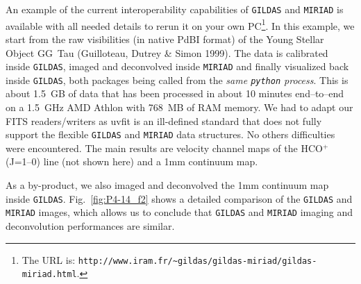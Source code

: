 \documentclass[11pt,twoside]{article}  %
\newcommand{\GILDAS}{\texttt{GILDAS}}
\newcommand{\MIRIAD}{\texttt{MIRIAD}}
\newcommand{\python}{\texttt{python}}
\newcommand{\PdBI}{\textrm{PdBI}}
\newcommand{\HCOp} {\mbox{HCO$^{+}$}} %
\newcommand{\Jone}{\mbox{(J=1--0)}}
\begin{document}
An example of the current interoperability capabilities of \GILDAS{} and
\MIRIAD{} is available with all needed details to rerun it on your own
PC\footnote{The URL is:
  \texttt{http://www.iram.fr/\~{}gildas/gildas-miriad/gildas-miriad.html}.}.
In this example, we start from the raw visibilities (in native \PdBI{}
format) of the Young Stellar Object GG~Tau (Guilloteau, Dutrey \& Simon
1999). The data is calibrated inside \GILDAS{}, imaged and deconvolved
inside \MIRIAD{} and finally visualized back inside \GILDAS{}, both
packages being called from the \emph{same \python{} process}. This is about
1.5~GB of data that has been processed in about 10 minutes end--to--end on
a 1.5~GHz AMD Athlon with 768~MB of RAM memory. We had to adapt our FITS
readers/writers as uvfit is an ill-defined standard that does not fully
support the flexible \GILDAS{} and \MIRIAD{} data structures. No others
difficulties were encountered. The main results are velocity channel maps
of the \HCOp{} \Jone{} line (not shown here) and a 1mm continuum map.

As a by-product, we also imaged and deconvolved the 1mm continuum map
inside \GILDAS{}. Fig.~\ref{fig:P4-14_f2} shows a detailed comparison of the
\GILDAS{} and \MIRIAD{} images, which allows us to conclude that \GILDAS{}
and \MIRIAD{} imaging and deconvolution performances are similar.
\end{document}
